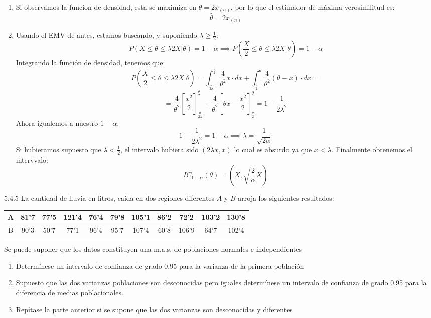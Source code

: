\begin{sol}
    \begin{enumerate}
        \item Si observamos la funcion de densidad, esta se maximiza en $\theta = 2x_{(n)}$, por lo que el estimador de máxima verosimilitud es:
        $$\hat{\theta} = 2x_{(n)}$$
        \item Usando el EMV de antes, estamos buscando, y suponiendo $\lambda \geq \frac{1}{2}$:
        $$ P\left( X \leq \theta \leq \lambda 2X | \theta \right) = 1 - \alpha \implies P\left( \frac{X}{2} \leq \theta \leq \lambda 2X | \theta \right) = 1 - \alpha$$
        Integrando la función de densidad, tenemos que:
        $$ P\left( \frac{X}{2} \leq \theta \leq \lambda 2X | \theta \right) = \int_{\frac{\theta}{2\lambda}}^{\frac{\theta}{2}} \frac{4}{\theta^2}x \cdot dx + \int_{\frac{\theta}{2}}^{\theta} \frac{4}{\theta^2}(\theta - x) \cdot dx =$$
        $$ = \frac{4}{\theta^2} \left[ \frac{x^2}{2} \right]_{\frac{\theta}{2\lambda}}^{\frac{\theta}{2}} + \frac{4}{\theta^2} \left[ \theta x - \frac{x^2}{2} \right]_{\frac{\theta}{2}}^{\theta} = 1 - \frac{1}{2\lambda^2}$$
        Ahora igualemos a nuestro $1 - \alpha$:
        $$1 - \frac{1}{2\lambda^2} = 1 - \alpha \implies \lambda = \frac{1}{\sqrt{2\alpha}}$$
        Si hubieramos supuesto que $\lambda < \frac{1}{2}$, el intervalo hubiera sido $(2\lambda x, x)$ lo cual es absurdo ya que $x<\lambda$.
        Finalmente obtenemos el intervvalo:
        $$ IC_{1 - \alpha}(\theta) = \left(X,\sqrt{\frac{2}{\alpha}}X\right)$$
    \end{enumerate}
\end{sol}
\begin{problem}{5.4.5}
    La cantidad de lluvia en litros, caída en dos regiones diferentes $A$ y $B$ arroja los siguientes resultados: 
    \begin{center}
        \begin{tabular}{|c|*{10}{c|}}
            \hline
            A & 81'7 & 77'5 & 121'4 & 76'4 & 79'8 & 105'1 & 86'2 & 72'2 & 103'2 & 130'8 \\
            \hline
            B & 90'3 & 50'7 & 77'1 & 96'4 & 95'7 & 107'4 & 60'8 & 106'9 & 64'7 & 102'4 \\
            \hline
        \end{tabular}
    \end{center}

    Se puede suponer que los datos constituyen una m.a.s. de poblaciones normales e independientes
    \begin{enumerate}
        \item Determínese un intervalo de confianza de grado 0.95 para la varianza de la primera población
        \item Supuesto que las dos varianzas poblaciones son desconocidas pero iguales determínese un intervalo de confianza de grado 0.95 para la diferencia de medias poblacionales. 
        \item Repítase la parte anterior si se supone que las dos varianzas son desconocidas y diferentes
    \end{enumerate}
\end{problem}
